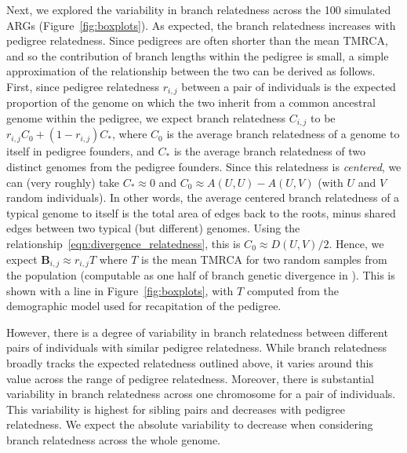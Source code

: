 Next, we explored the variability in branch relatedness across the 100 simulated ARGs
(Figure~\ref{fig:boxplots}).
%
As expected, the branch relatedness increases with pedigree relatedness.
%
Since pedigrees are often shorter than the mean TMRCA,
and so the contribution of branch lengths within the pedigree is small,
a simple approximation of the relationship between the two
can be derived as follows.
%
First, since pedigree relatedness $r_{i,j}$ between a pair of individuals
is the expected proportion of the genome on which the two inherit from
a common ancestral genome within the pedigree,
we expect branch relatedness $C_{i,j}$ to be $r_{i,j} C_0 + (1 - r_{i,j}) C_*$,
where $C_0$ is the average branch relatedness of a genome to itself in pedigree founders,
and $C_*$ is the average branch relatedness of two distinct genomes from the pedigree founders.
%
Since this relatedness is \emph{centered}, we can (very roughly) take
$C_* \approx 0$ and $C_0 \approx A(U,U) - A(U,V)$ (with $U$ and $V$ random individuals).
%
In other words, the average centered branch relatedness
of a typical genome to itself is the total area of edges back to the roots,
minus shared edges between two typical (but different) genomes.
%
Using the relationship~\eqref{eqn:divergence_relatedness},
this is $C_0 \approx D(U,V)/2$.
%
Hence, we expect $\mathbf{B}_{i,j} \approx r_{i,j} T$
where $T$ is the mean TMRCA for two random samples from the population
(computable as one half of branch genetic divergence in \tskit{}).
%
This is shown with a line in Figure~\ref{fig:boxplots},
with $T$ computed from the demographic model used for recapitation of the pedigree.

However, there is a degree of variability in branch relatedness
between different pairs of individuals with similar pedigree relatedness.
%
While branch relatedness broadly tracks the expected relatedness outlined above,
it varies around this value across the range of pedigree relatedness.
%
Moreover, there is substantial variability in branch relatedness across one chromosome
for a pair of individuals.
%
This variability is highest for sibling pairs and decreases with pedigree relatedness.
%
We expect the absolute variability to decrease when considering
branch relatedness across the whole genome.

